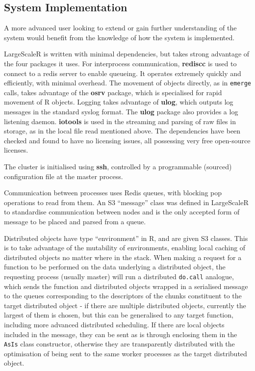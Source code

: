 \subsection{System Implementation}\label{sec:sys-imp}

A more advanced user looking to extend or gain further understanding of the system would benefit from the knowledge of how the system is implemented.

LargeScaleR is written with minimal dependencies, but takes strong advantage of the four packages it uses.
For interprocess communication, \textbf{rediscc} is used to connect to a redis server to enable queueing\cite{rediscc}.
It operates extremely quickly and efficiently, with minimal overhead.
The movement of objects directly, as in \texttt{emerge} calls, takes advantage of the \textbf{osrv} package, which is specialised for rapid movement of R objects\cite{osrv}.
Logging takes advantage of \textbf{ulog}, which outputs log messages in the standard syslog format\cite{ulog}.
The \textbf{ulog} package also provides a log listening daemon.
\textbf{iotools} is used in the streaming and parsing of raw files in storage, as in the local file read mentioned above\cite{iotools}.
The dependencies have been checked and found to have no licensing issues, all possessing very free open-source licenses.

The cluster is initialised using \textbf{ssh}, controlled by a programmable (sourced) configuration file at the master process\cite{ylonen2006secure}.

Communication between processes uses Redis queues, with blocking pop operations to read from them.
An S3 ``message'' class was defined in LargeScaleR to standardise communication between nodes and is the only accepted form of message to be placed and parsed from a queue.

Distributed objects have type ``environment'' in R, and are given S3 classes.
This is to take advantage of the mutability of environments, enabling local caching of distributed objects no matter where in the stack.
When making a request for a function to be performed on the data underlying a distributed object, the requesting process (usually master) will run a distributed \texttt{do.call} analogue, which sends the function and distributed objects wrapped in a serialised message to the queues corresponding to the descriptors of the chunks constituent to the target distributed object - if there are multiple distributed objects, currently the largest of them is chosen, but this can be generalised to any target function, including more advanced distributed scheduling.
If there are local objects included in the message, they can be sent as is through enclosing them in the \texttt{AsIs} class constructor, otherwise they are transparently distributed with the optimisation of being sent to the same worker processes as the target distributed object.

